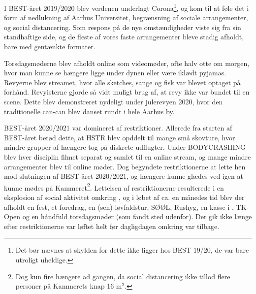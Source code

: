 
I BEST-året 2019/2020 blev verdenen underlagt Corona\footnote{Det bør nævnes at skylden for dette ikke ligger hos BEST 19/20, de var bare utroligt uheldige.}, og \TKET kom til at føle det i form af nedlukning af Aarhus Universitet, begrænsning af sociale arrangementer, og social distancering. Som respons på de nye omstændigheder viste \TKET sig fra sin standhaftige side, og de fleste af vores faste arrangementer bleve stadig afholdt, bare med gentænkte formater.

Torsdagsmøderne blev afholdt online som videomøder, ofte halv otte om morgen, hvor man kunne se hængere ligge under dynen eller være iklædt pyjamas. Revyerne blev streamet, hvor alle sketches, sange og fisk var blevet optaget på forhånd. Revyisterne gjorde så vidt muligt brug af, at revy ikke var bundet til en scene. Dette blev demonstreret nydeligt under julerevyen 2020, hvor den traditionelle can-can blev danset rundt i hele Aarhus by.

BEST-året 2020/2021 var domineret af restriktioner. Allerede fra starten af BEST-året betød dette, at HSTR blev opddelt til mange små skovture, hvor mindre grupper af hængere tog på diskrete udflugter. Under BODYCRASHING blev hver disciplin filmet separat og samlet til en online stream, og mange mindre arrangementer blev til online møder. Dog begyndete restriktionerne at lette hen mod slutningen af BEST-året 2020/2021, og hængere kunne glædes ved igen at kunne mødes på Kammeret\footnote{Dog kun fire hængere ad gangen, da social distancering ikke tillod flere personer på Kammerets knap 16 m$^2$.}. Lettelsen af restriktionerne resulterede i en eksplosion af social aktivitet omkring \TKET{}, og i løbet af ca. en månedes tid blev der afholdt en fest, et foredrag, en (sen) løvfaldstur, SØØL, Rushyg, en kasse i \KASS, TK-Open og en håndfuld torsdagsmøder (som fandt sted udenfor). Der gik ikke længe efter restriktionerne var løftet helt før dagligdagen omkring \TKET var tilbage.


